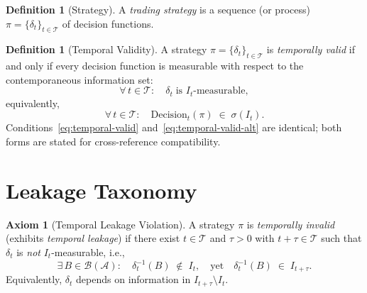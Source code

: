 \documentclass[12pt,openany]{book}
\newcommand{\calI}{\mathcal{I}}
\newcommand{\calA}{\mathcal{A}}
\numberwithin{equation}{chapter}
\theoremstyle{plain}
\theoremstyle{definition}
\newtheorem{definition}[theorem]{Definition}
\newtheorem{axiom}[theorem]{Axiom}
\theoremstyle{remark}
\numberwithin{equation}{chapter}
\theoremstyle{plain}
\def\calI{I}%
\begin{document}
\begin{definition}[Strategy]
\label{def:strategy}
A \emph{trading strategy} is a sequence (or process)
$\pi = \{\delta_t\}_{t \in \mathcal{T}}$ of decision functions.
\end{definition}

\begin{definition}[Temporal Validity]
\label{def:temporal-validity}
A strategy $\pi = \{\delta_t\}_{t \in \mathcal{T}}$ is
\emph{temporally valid} if and only if every decision function is
measurable with respect to the contemporaneous information set:
\begin{equation}
  \forall\, t \in \mathcal{T}:\quad
  \delta_t \;\text{is } \calI_t\text{-measurable},
  \label{eq:temporal-valid}
\end{equation}
equivalently,
\begin{equation}
  \forall\, t \in \mathcal{T}:\quad
  \mathrm{Decision}_t(\pi) \;\in\; \sigma(\calI_t).
  \label{eq:temporal-valid-alt}
\end{equation}
Conditions~\eqref{eq:temporal-valid} and~\eqref{eq:temporal-valid-alt}
are identical; both forms are stated for cross-reference compatibility.
\end{definition}

\section{Leakage Taxonomy}

\begin{axiom}[Temporal Leakage Violation]
\label{ax:leakage}
A strategy $\pi$ is \emph{temporally invalid} (exhibits
\emph{temporal leakage}) if there exist $t \in \mathcal{T}$ and
$\tau > 0$ with $t + \tau \in \mathcal{T}$ such that
$\delta_t$ is \emph{not} $\calI_t$-measurable, i.e.,
\begin{equation}
  \exists\, B \in \mathcal{B}(\calA) :
  \quad \delta_t^{-1}(B) \;\notin\; \calI_t,
  \quad\text{yet}\quad
  \delta_t^{-1}(B) \;\in\; \calI_{t+\tau}.
  \label{eq:leakage-def}
\end{equation}
Equivalently, $\delta_t$ depends on information in
$\calI_{t+\tau} \setminus \calI_t$.
\end{axiom}
\end{document}
